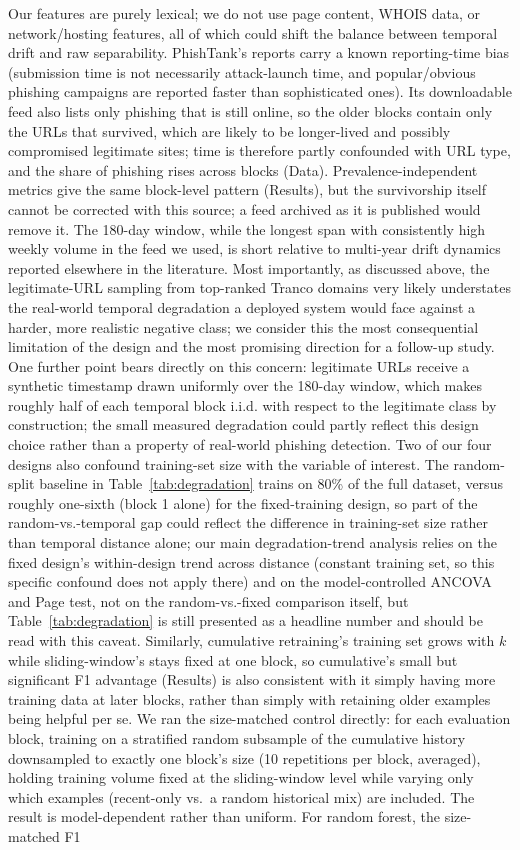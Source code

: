 \documentclass[10pt, a4paper, oneside]{article}
\begin{document}
Our features are purely lexical; we do not use page content, WHOIS data, or network/hosting features, all of which could shift the balance between temporal drift and raw separability. PhishTank's reports carry a known reporting-time bias (submission time is not necessarily attack-launch time, and popular/obvious phishing campaigns are reported faster than sophisticated ones). Its downloadable feed also lists only phishing that is still online, so the older blocks contain only the URLs that survived, which are likely to be longer-lived and possibly compromised legitimate sites; time is therefore partly confounded with URL type, and the share of phishing rises across blocks (Data). Prevalence-independent metrics give the same block-level pattern (Results), but the survivorship itself cannot be corrected with this source; a feed archived as it is published would remove it. The 180-day window, while the longest span with consistently high weekly volume in the feed we used, is short relative to multi-year drift dynamics reported elsewhere in the literature. Most importantly, as discussed above, the legitimate-URL sampling from top-ranked Tranco domains very likely understates the real-world temporal degradation a deployed system would face against a harder, more realistic negative class; we consider this the most consequential limitation of the design and the most promising direction for a follow-up study. One further point bears directly on this concern: legitimate URLs receive a synthetic timestamp drawn uniformly over the 180-day window, which makes roughly half of each temporal block i.i.d. with respect to the legitimate class by construction; the small measured degradation could partly reflect this design choice rather than a property of real-world phishing detection. Two of our four designs also confound training-set size with the variable of interest. The random-split baseline in Table~\ref{tab:degradation} trains on 80\% of the full dataset, versus roughly one-sixth (block 1 alone) for the fixed-training design, so part of the random-vs.-temporal gap could reflect the difference in training-set size rather than temporal distance alone; our main degradation-trend analysis relies on the fixed design's within-design trend across distance (constant training set, so this specific confound does not apply there) and on the model-controlled ANCOVA and Page test, not on the random-vs.-fixed comparison itself, but Table~\ref{tab:degradation} is still presented as a headline number and should be read with this caveat. Similarly, cumulative retraining's training set grows with $k$ while sliding-window's stays fixed at one block, so cumulative's small but significant F1 advantage (Results) is also consistent with it simply having more training data at later blocks, rather than simply with retaining older examples being helpful per se. We ran the size-matched control directly: for each evaluation block, training on a stratified random subsample of the cumulative history downsampled to exactly one block's size (10 repetitions per block, averaged), holding training volume fixed at the sliding-window level while varying only which examples (recent-only vs.\ a random historical mix) are included. The result is model-dependent rather than uniform. For random forest, the size-matched F1 
\end{document}

